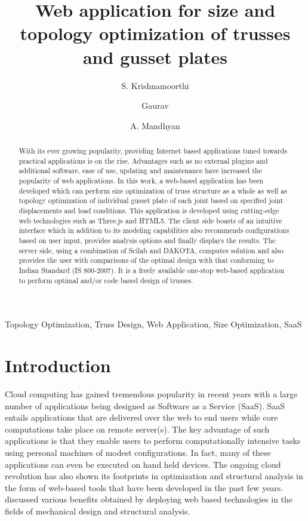 \documentclass[preprint]{elsarticle}
\begin{document}
\begin{frontmatter}
\title{Web application for size and topology optimization of trusses and gusset plates}

\author[l1]{S. Krishnamoorthi}
\address[l1]{US Naval Research Laboratory, Washington DC, USA.}

\author[l2]{Gaurav}
\address[l2]{Department of Civil Engineering, IIT Gandhinagar, Gujarat, India.}

\author[l3]{A. Mandhyan}
\address[l3]{Linde Engineering Pvt. Ltd., Gujarat, India.}

\begin{abstract}
With its ever growing popularity, providing Internet based applications tuned
towards practical applications is on the rise. Advantages such as no external
plugins and additional software, ease of use, updating and maintenance have
increased the popularity of web applications. In this work, a
web-based application has been developed which can  perform size optimization of
truss structure as
a whole as well as topology optimization of individual gusset plate of each
joint based on specified joint displacements and load conditions. This
application is developed using cutting-edge web technologies such as Three.js and
HTML5. The client side boasts of an intuitive interface which in addition to its
modeling capabilities also recommends configurations based on user input, provides
analysis options and finally displays the results. The server side, using a
combination of Scilab and DAKOTA, computes solution and also provides the user
with comparisons of the optimal design with that conforming to Indian Standard
(IS 800-2007). It is a freely available one-stop web-based application to
perform optimal and/or code based design of trusses.
\end{abstract}
\begin{keyword}
  {Topology Optimization, Truss Design, Web Application, Size Optimization, SaaS}
\end{keyword}
\end{frontmatter}
\section{Introduction}
Cloud computing has gained tremendous popularity in recent years with a large
number of applications being designed as Software as a Service (SaaS). SaaS
entails applications that are delivered over the web to end users while core
computations take place on remote server(s). The key advantage of such
applications is that they enable users to perform computationally intensive
tasks using personal machines of modest configurations. In fact, many of these
applications can even be executed on hand held devices.
The ongoing cloud revolution has also shown its footprints in optimization and
structural analysis in the form of web-based tools that have been developed in
the past few years. \citet{eynard2005web} discussed various
benefits obtained by deploying web based technologies in the fields of 
mechanical design and structural analysis.
\end{document}
